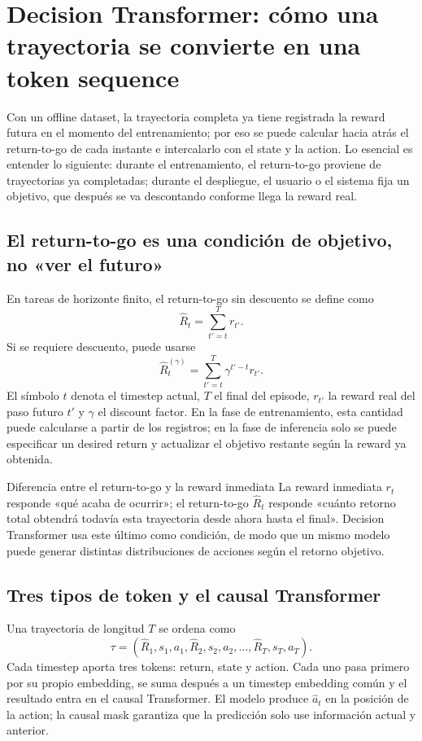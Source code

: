 \section{Decision Transformer: cómo una trayectoria se convierte en una token sequence}

Con un offline dataset, la trayectoria completa ya tiene registrada la reward futura en el momento del entrenamiento; por eso se puede calcular hacia atrás el return-to-go de cada instante e intercalarlo con el state y la action. Lo esencial es entender lo siguiente: durante el entrenamiento, el return-to-go proviene de trayectorias ya completadas; durante el despliegue, el usuario o el sistema fija un objetivo, que después se va descontando conforme llega la reward real.

\subsection{El return-to-go es una condición de objetivo, no «ver el futuro»}

En tareas de horizonte finito, el return-to-go sin descuento se define como
\[
\widehat{R}_t=\sum_{t'=t}^{T}r_{t'}.
\]
Si se requiere descuento, puede usarse
\[
\widehat{R}^{(\gamma)}_t=\sum_{t'=t}^{T}\gamma^{t'-t}r_{t'}.
\]
El símbolo $t$ denota el timestep actual, $T$ el final del episode, $r_{t'}$ la reward real del paso futuro $t'$ y $\gamma$ el discount factor. En la fase de entrenamiento, esta cantidad puede calcularse a partir de los registros; en la fase de inferencia solo se puede especificar un desired return y actualizar el objetivo restante según la reward ya obtenida.

\begin{importantbox}{Diferencia entre el return-to-go y la reward inmediata}
La reward inmediata $r_t$ responde «qué acaba de ocurrir»; el return-to-go $\widehat{R}_t$ responde «cuánto retorno total obtendrá todavía esta trayectoria desde ahora hasta el final». Decision Transformer usa este último como condición, de modo que un mismo modelo puede generar distintas distribuciones de acciones según el retorno objetivo.
\end{importantbox}

\subsection{Tres tipos de token y el causal Transformer}

Una trayectoria de longitud $T$ se ordena como
\[
\tau=(\widehat{R}_1,s_1,a_1,\widehat{R}_2,s_2,a_2,\ldots,\widehat{R}_T,s_T,a_T).
\]
Cada timestep aporta tres tokens: return, state y action. Cada uno pasa primero por su propio embedding, se suma después a un timestep embedding común y el resultado entra en el causal Transformer. El modelo produce $\widehat{a}_t$ en la posición de la action; la causal mask garantiza que la predicción solo use información actual y anterior.

